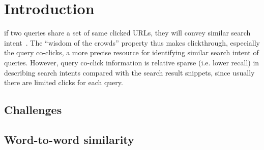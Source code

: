 \section{Introduction}
if two queries share a set of same clicked URLs, they will convey
similar search intent~\cite{baeza-yates_query_2005,
  beeferman_agglomerative_2000-1}. The “wisdom of the crowds” property
thus makes clickthrough, especially the query co-clicks, a more
precise resource for identifying similar search intent of
queries. However, query co-click information is relative sparse
(i.e. lower recall) in describing search intents compared with the
search result snippets, since usually there are limited clicks for
each query.

\subsection{Challenges}

\subsection{Word-to-word similarity}
